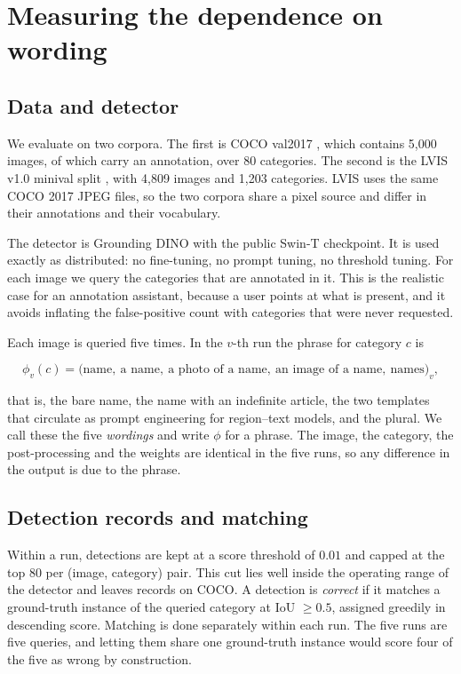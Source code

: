 \section{Measuring the dependence on wording}\label{sec:task}

\subsection{Data and detector}

We evaluate on two corpora. The first is COCO val2017 \citep{lin2014microsoft}, which contains
5{,}000 images, of which \NIMAGES{} carry an annotation, over 80 categories. The second is the
LVIS v1.0 minival split \citep{gupta2019lvis}, with 4{,}809 images and 1{,}203 categories. LVIS
uses the same COCO 2017 JPEG files, so the two corpora share a pixel source and differ in their
annotations and their vocabulary.

The detector is Grounding DINO \citep{liu2024grounding} with the public Swin-T checkpoint. It is
used exactly as distributed: no fine-tuning, no prompt tuning, no threshold tuning. For each
image we query the categories that are annotated in it. This is the realistic case for an
annotation assistant, because a user points at what is present, and it avoids inflating the
false-positive count with categories that were never requested.

Each image is queried five times. In the $v$-th run the phrase for category $c$ is

\begin{equation}
\phi_v(c) = \big(\text{name},\ \text{a name},\ \text{a photo of a name},\
\text{an image of a name},\ \text{names}\big)_v ,
\end{equation}

that is, the bare name, the name with an indefinite article, the two templates that circulate
as prompt engineering for region--text models, and the plural. We call these the five
\emph{wordings} and write $\phi$ for a phrase. The image, the category, the post-processing and
the weights are identical in the five runs, so any difference in the output is due to the
phrase.

\subsection{Detection records and matching}

Within a run, detections are kept at a score threshold of $0.01$ and capped at the top 80 per
(image, category) pair. This cut lies well inside the operating range of the detector and leaves
\NDETS{} records on COCO. A detection is \emph{correct} if it matches a ground-truth instance of
the queried category at IoU $\geq 0.5$, assigned greedily in descending score. Matching is done
separately within each run. The five runs are five queries, and letting them share one
ground-truth instance would score four of the five as wrong by construction.


